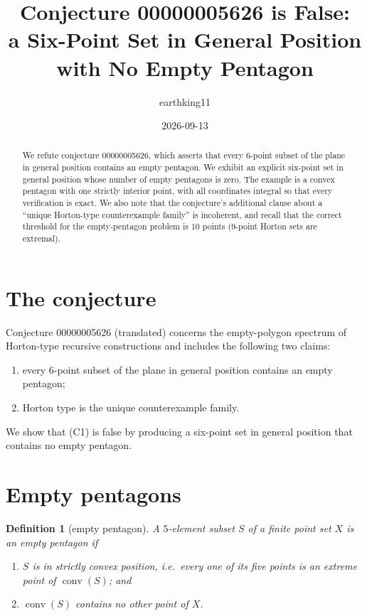 \documentclass[11pt]{article}
\title{Conjecture 00000005626 is False:\\ a Six-Point Set in General Position with No Empty Pentagon}
\author{earthking11}
\date{2026-09-13}
\newtheorem{definition}{Definition}
\theoremstyle{remark}
\begin{document}
\maketitle

\begin{abstract}
We refute conjecture 00000005626, which asserts that every $6$-point subset
of the plane in general position contains an empty pentagon.  We exhibit an
explicit six-point set in general position whose number of empty pentagons
is zero.  The example is a convex pentagon with one strictly interior point,
with all coordinates integral so that every verification is exact.  We also
note that the conjecture's additional clause about a ``unique Horton-type
counterexample family'' is incoherent, and recall that the correct threshold
for the empty-pentagon problem is $10$ points ($9$-point Horton sets are
extremal).
\end{abstract}

\section{The conjecture}

Conjecture 00000005626 (translated) concerns the empty-polygon spectrum of
Horton-type recursive constructions and includes the following two claims:

\begin{enumerate}
\item[(C1)] every $6$-point subset of the plane in general position contains
an empty pentagon;
\item[(C2)] Horton type is the unique counterexample family.
\end{enumerate}

We show that (C1) is false by producing a six-point set in general position
that contains no empty pentagon.

\section{Empty pentagons}

\begin{definition}[empty pentagon]
A $5$-element subset $S$ of a finite point set $X$ is an \emph{empty
pentagon} if
\begin{enumerate}
\item[(i)] $S$ is in \emph{strictly convex position}, i.e.\ every one of its
five points is an extreme point of $\operatorname{conv}(S)$; and
\item[(ii)] $\operatorname{conv}(S)$ contains no other point of $X$.
\end{enumerate}
\end{definition}
\end{document}
